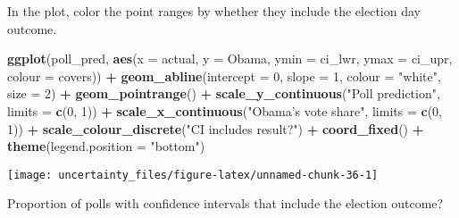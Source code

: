 \documentclass[]{book}
\newenvironment{Shaded}{\begin{snugshade}}{\end{snugshade}}
\newcommand{\KeywordTok}[1]{\textcolor[rgb]{0.13,0.29,0.53}{\textbf{#1}}}
\newcommand{\DataTypeTok}[1]{\textcolor[rgb]{0.13,0.29,0.53}{#1}}
\newcommand{\DecValTok}[1]{\textcolor[rgb]{0.00,0.00,0.81}{#1}}
\newcommand{\StringTok}[1]{\textcolor[rgb]{0.31,0.60,0.02}{#1}}
\newcommand{\CommentTok}[1]{\textcolor[rgb]{0.56,0.35,0.01}{\textit{#1}}}
\newcommand{\OperatorTok}[1]{\textcolor[rgb]{0.81,0.36,0.00}{\textbf{#1}}}
\newcommand{\NormalTok}[1]{#1}
\theoremstyle{definition}
\theoremstyle{definition}
\theoremstyle{definition}
\theoremstyle{remark}
\begin{document}
In the plot, color the point ranges by whether they include the election
day outcome.

\begin{Shaded}
\begin{Highlighting}[]
\KeywordTok{ggplot}\NormalTok{(poll_pred, }\KeywordTok{aes}\NormalTok{(}\DataTypeTok{x =}\NormalTok{ actual, }\DataTypeTok{y =}\NormalTok{ Obama,}
                      \DataTypeTok{ymin =}\NormalTok{ ci_lwr, }\DataTypeTok{ymax =}\NormalTok{ ci_upr,}
                      \DataTypeTok{colour =}\NormalTok{ covers)) }\OperatorTok{+}
\StringTok{  }\KeywordTok{geom_abline}\NormalTok{(}\DataTypeTok{intercept =} \DecValTok{0}\NormalTok{, }\DataTypeTok{slope =} \DecValTok{1}\NormalTok{, }\DataTypeTok{colour =} \StringTok{"white"}\NormalTok{, }\DataTypeTok{size =} \DecValTok{2}\NormalTok{) }\OperatorTok{+}
\StringTok{  }\KeywordTok{geom_pointrange}\NormalTok{() }\OperatorTok{+}
\StringTok{  }\KeywordTok{scale_y_continuous}\NormalTok{(}\StringTok{"Poll prediction"}\NormalTok{, }\DataTypeTok{limits =} \KeywordTok{c}\NormalTok{(}\DecValTok{0}\NormalTok{, }\DecValTok{1}\NormalTok{)) }\OperatorTok{+}
\StringTok{  }\KeywordTok{scale_x_continuous}\NormalTok{(}\StringTok{"Obama's vote share"}\NormalTok{, }\DataTypeTok{limits =} \KeywordTok{c}\NormalTok{(}\DecValTok{0}\NormalTok{, }\DecValTok{1}\NormalTok{)) }\OperatorTok{+}
\StringTok{  }\KeywordTok{scale_colour_discrete}\NormalTok{(}\StringTok{"CI includes result?"}\NormalTok{) }\OperatorTok{+}
\StringTok{  }\KeywordTok{coord_fixed}\NormalTok{() }\OperatorTok{+}
\StringTok{  }\KeywordTok{theme}\NormalTok{(}\DataTypeTok{legend.position =} \StringTok{"bottom"}\NormalTok{)}
\end{Highlighting}
\end{Shaded}

\begin{center}\texttt{[image: uncertainty\_files/figure-latex/unnamed-chunk-36-1]} \end{center}

Proportion of polls with confidence intervals that include the election
outcome?

\begin{Shaded}
\end{Shaded}
\end{document}
